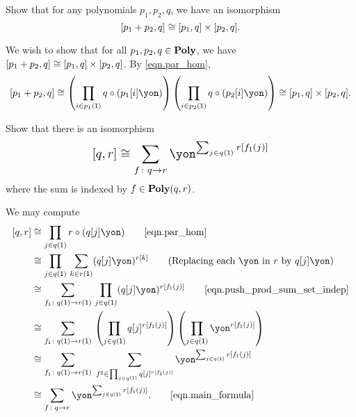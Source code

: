 \documentclass[Book-Poly]{subfiles}
\begin{document}
\begin{exercise}\label{exc.sum_times_closure}
Show that for any polynomials $p_1,p_2,q$, we have an isomorphism
\[
[p_1 + p_2, q] \cong [p_1, q] \times [p_2, q].
\]
\begin{solution}
We wish to show that for all $p_1, p_2, q \in \mathbf{Poly}$, we have $[p_1 + p_2, q] \cong [p_1, q] \times [p_2, q]$.
By \eqref{eqn.par_hom},
\[
    \ihom{p_1 + p_2, q} \iso \left(\prod_{i \in p_1(\1)} q \circ (p_1[i]\yon)\right) \left(\prod_{i \in p_2(\1)} q \circ (p_2[i]\yon)\right) \iso \ihom{p_1, q} \times \ihom{p_2, q}.
\]
\end{solution}
\end{exercise}

\begin{exercise} \label{exc.par_hom_sum}
Show that there is an isomorphism
\begin{equation} \label{eqn.par_hom_sum}
\scalebox{1.3}{$\displaystyle
\ihom{q,r} \iso \sum_{f\colon q\to r}\yon^{\sum_{j\in q(\1)}r[f_\1(j)]}
$}
\end{equation}
where the sum is indexed by $f\in\mathbf{Poly}(q,r)$.
\begin{solution}
We may compute
\begin{align*}
    \ihom{q, r} &\iso \prod_{j \in q(\1)} r \circ (q[j]\yon) \tag*{\eqref{eqn.par_hom}} \\
    &\iso \prod_{j \in q(\1)} \, \sum_{k \in r(\1)} (q[j]\yon)^{r[k]} \tag{Replacing each $\yon$ in $r$ by $q[j]\yon$} \\
    &\iso \sum_{f_\1 \colon q(\1) \to r(\1)} \, \prod_{j \in q(\1)} (q[j]\yon)^{r[f_\1(j)]} \tag*{\eqref{eqn.push_prod_sum_set_indep}} \\
    &\iso \sum_{f_\1 \colon q(\1) \to r(\1)} \, \left(\prod_{j \in q(\1)} q[j]^{r[f_\1(j)]} \right)\left(\prod_{j \in q(\1)} \yon^{r[f_\1(j)]} \right) \\
    &\iso \sum_{f_\1 \colon q(\1) \to r(\1)} \; \sum_{f^\sharp \in \prod_{j \in q(\1)} q[j]^{r[f_\1(j)]}} \yon^{\sum_{j \in q(\1)} r[f_\1(j)]} \\
    &\iso \sum_{f \colon q \to r} \yon^{\sum_{j \in q(\1)} r[f_\1(j)]}. \tag*{\eqref{eqn.main_formula}}
\end{align*}
\end{solution}
\end{exercise}
\end{document}
